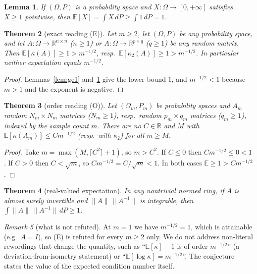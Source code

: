 \documentclass[11pt]{article}
\renewcommand{\_}{\oldus\allowbreak}
\newtheorem{theorem}{Theorem}
\newtheorem{lemma}[theorem]{Lemma}
\theoremstyle{definition}
\theoremstyle{remark}
\newtheorem{remark}[theorem]{Remark}
\begin{document}
\begin{lemma}\label{lem:exp}
If $(\Omega,P)$ is a probability space and $X:\Omega\to[0,+\infty]$ satisfies $X\ge1$ pointwise, then
$\mathbb{E}[X]=\int X\,dP\ge\int 1\,dP=1$.
\end{lemma}

\begin{theorem}[exact reading (E)]\label{thm:exact}
Let $m\ge2$, let $(\Omega,P)$ be any probability space, and let $A:\Omega\to\mathbb{R}^{n\times n}$
($n\ge1$) or $A:\Omega\to\mathbb{R}^{p\times q}$ ($q\ge1$) be any random matrix. Then
$\mathbb{E}[\kappa(A)]\ge1>m^{-1/2}$, resp.\ $\mathbb{E}[\kappa_2(A)]\ge1>m^{-1/2}$. In particular
neither expectation equals $m^{-1/2}$.
\end{theorem}

\begin{proof}
Lemmas~\ref{lem:ge1} and~\ref{lem:exp} give the lower bound $1$, and $m^{-1/2}<1$ because $m>1$ and
the exponent is negative.
\end{proof}

\begin{theorem}[order reading (O)]\label{thm:order}
Let $(\Omega_m,P_m)$ be probability spaces and $A_m$ random $N_m\times N_m$ matrices ($N_m\ge1$), resp.\
random $p_m\times q_m$ matrices ($q_m\ge1$), indexed by the sample count $m$. There are no $C\in\mathbb{R}$
and $M$ with $\mathbb{E}[\kappa(A_m)]\le C m^{-1/2}$ (resp.\ with $\kappa_2$) for all $m\ge M$.
\end{theorem}

\begin{proof}
Take $m=\max(M,\lceil C^2\rceil+1)$, so $m>C^2$. If $C\le0$ then $Cm^{-1/2}\le0<1$. If $C>0$ then
$C<\sqrt m$, so $Cm^{-1/2}=C/\sqrt m<1$. In both cases $\mathbb{E}\ge1>Cm^{-1/2}$.
\end{proof}

\begin{theorem}[real-valued expectation]\label{thm:bochner}
In any nontrivial normed ring, if $A$ is almost surely invertible and $\|A\|\,\|A^{-1}\|$ is integrable,
then $\int\|A\|\,\|A^{-1}\|\,dP\ge1$.
\end{theorem}

\begin{remark}[what is not refuted]
At $m=1$ we have $m^{-1/2}=1$, which is attainable (e.g.\ $A=I$), so (E) is refuted for every $m\ge 2$
only. We do not address non-literal rewordings that change the quantity, such as
``$\mathbb{E}[\kappa]-1$ is of order $m^{-1/2}$'' (a deviation-from-isometry statement) or
``$\mathbb{E}[\log\kappa]=m^{-1/2}$''. The conjecture states the value of the expected condition number
itself.
\end{remark}
\end{document}

